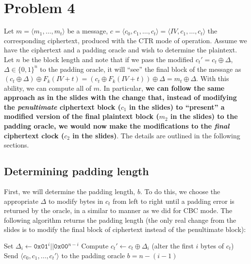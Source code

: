 \documentclass[12pt]{article}
\numberwithin{equation}{section}
\theoremstyle{plain}
\newcommand{\set}[1]{\{ #1 \}}
\begin{document}
\section*{Problem 4}

Let $m = \langle m_1, \ldots, m_t \rangle$ be a message,
$c = \langle c_0, c_1, \ldots, c_t \rangle = \langle IV, c_1, \ldots, c_t \rangle$ the corresponding ciphertext,
produced with the CTR mode of operation.
Assume we have the ciphertext and a padding oracle and wish to determine the plaintext.
Let $n$ be the block length and note that if we pass the modified $c_t' = c_t \oplus \Delta$,
$\Delta \in \set{ 0, 1 }^n$ to the padding oracle,
it will ``see'' the final block of the message as $(c_t \oplus \Delta) \oplus F_k(IV + t) = (c_t \oplus F_k(IV + t)) \oplus \Delta = m_t \oplus \Delta$.
With this ability, we can compute all of $m$.
In particular, \textbf{we can follow the same approach as in the slides with the change that,
instead of modifying the \emph{penultimate} ciphertext block ($c_1$ in the slides)
to ``present'' a modified version of the final plaintext block ($m_2$ in the slides) to the padding oracle,
we would now make the modifications to the \emph{final} ciphertext clock ($c_2$ in the slides)}.
The details are outlined in the following sections.

\pagebreak

\subsection*{Determining padding length}

First, we will determine the padding length, $b$.
To do this, we choose the appropriate $\Delta$ to modify bytes in $c_t$ from left to right until a padding error is returned by the oracle,
in a similar to manner as we did for CBC mode.
The following algorithm returns the padding length
(the only real change from the slides is to modify the final block of ciphertext instead of the penultimate block):
\begin{algorithm}[H]
\begin{algorithmic}
    \For{$i \in \set{ 1, \ldots, n }$}
        \State Set $\Delta_i \gets \texttt{0x01}^i || \texttt{0x00}^{n - i}$
        \State Compute $c_t' \gets c_t \oplus \Delta_i$ (alter the first $i$ bytes of $c_t$)
        \State Send $\langle c_0, c_1, \ldots, c_t' \rangle$ to the padding oracle
            \State \Return $b = n - (i - 1)$
        \EndIf
    \EndFor
\EndProcedure
\end{algorithmic}
\end{algorithm}
\end{document}
